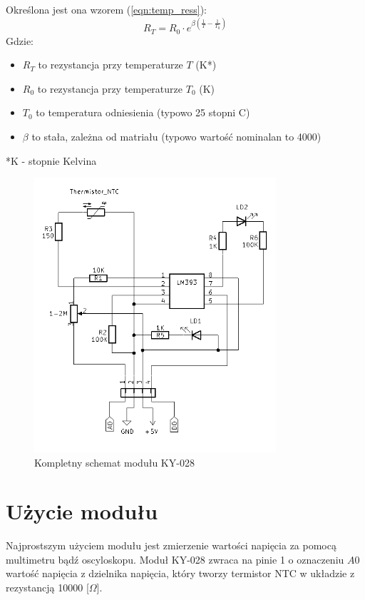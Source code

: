 \documentclass[11pt, a4paper]{article}
\begin{document}
\vspace{0.5cm}
Określona jest ona wzorem (\ref{eqn:temp_ress}):
\begin{equation}
    R_T = R_0 \cdot e^{\beta(\frac{1}{T}-\frac{1}{T_0})}
    \label{eqn:temp_ress}
\end{equation}
Gdzie:
\begin{itemize}
    \item $R_T$ to rezystancja przy temperaturze $T$ (K*)
    \item $R_0$ to rezystancja przy temperaturze $T_0$ (K)
    \item $T_0$ to temperatura odniesienia (typowo 25 stopni C)
    \item $\beta$ to stała, zależna od matriału (typowo wartość nominalan to 4000)
\end{itemize}
*K - stopnie Kelvina
\newpage
\begin{figure}[h]
    \centering
    \includegraphics[width=0.8\textwidth]{fig/KY-028/zasada_dzialania/schemat_ky028.PNG}
    \caption{Kompletny schemat modułu KY-028}
    \label{fig:polaczenie_ukladu}
\end{figure}
\newpage
\section{Użycie modułu}
Najprostszym użyciem modułu jest zmierzenie wartości napięcia za pomocą multimetru bądź oscyloskopu. Moduł KY-028 zwraca na pinie 1 o oznaczeniu $A0$ wartość napięcia z dzielnika napięcia, który tworzy termistor NTC w układzie z rezystancją 10000 [$\Omega$].
\end{document}
